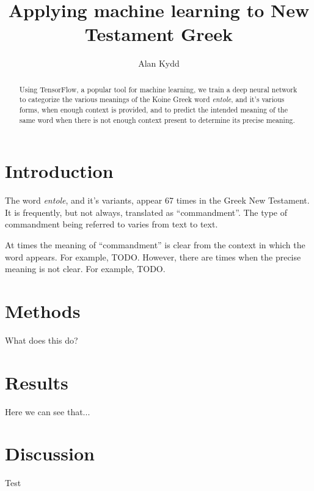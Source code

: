 \documentclass{article}
\title{Applying machine learning to New Testament Greek}
\author{Alan Kydd}
\begin{document}
\maketitle

\begin{abstract}
Using TensorFlow, a popular tool for machine learning, we train a deep neural
network to categorize the various meanings of the Koine Greek word \textit{entole},
        and it's various forms,
when enough context is provided, and to predict the intended meaning of the same
word when there is not enough context present to determine its precise meaning.
\end{abstract}

\section{Introduction}
The word \textit{entole}, and it's variants, appear 67 times in the Greek New 
Testament. It is frequently, but not always, translated as
``commandment''. The type of commandment being referred to varies from text to 
text.

At times the meaning of ``commandment'' is clear from the context in which
the word appears.  For example, TODO.  However, there are times when the precise
meaning is not clear.  For example, TODO.  

\section{Methods}
What does this do?

\section{Results}
Here we can see that...

\section{Discussion}
Test
\end{document}

